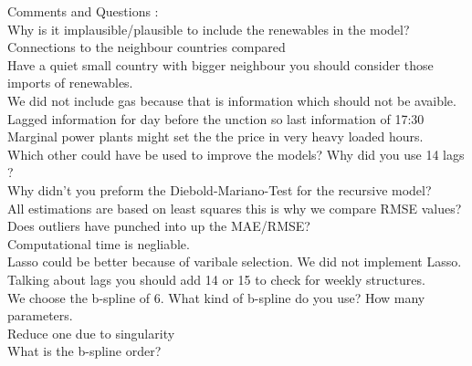 \documentclass[]{article}
\begin{document}
\begin{enumerate}
	Comments and Questions : \\\newline
	Why is it implausible/plausible to include the renewables in the model?\\\newline
	Connections to the neighbour countries compared \\\newline
	Have a quiet small country with bigger neighbour you should consider those imports of renewables.\\\newline
	We did not include gas because that is information which should not be avaible. \\\newline
	Lagged information for day before the unction so last information of 17:30 \\\newline
	Marginal power plants might set the the price in very heavy loaded hours. \\\newline
	Which other could have be used to improve the models? Why did you use 14 lags ?\\\newline
	Why didn't you preform the Diebold-Mariano-Test for the recursive model? \\\newline
	All estimations are based on least squares this is why we compare RMSE values?\\\newline
	Does outliers have punched into up the MAE/RMSE?\\\newline
	Computational time is negliable.\\\newline
	Lasso could be better because of varibale selection. We did not implement Lasso.\\\newline
	Talking about lags you should add 14 or 15 to check for weekly structures.\\\newline
	We choose the b-spline of 6. What kind of b-spline do you use? How many parameters.\\\newline
	Reduce one due to singularity\\\newline
	What is the b-spline order?\\\newline
	
\end{enumerate}
\end{document}
